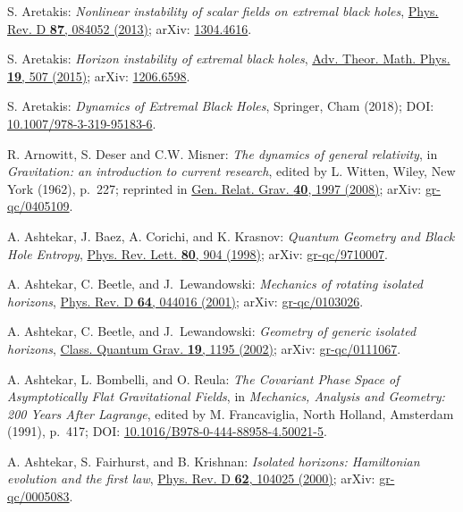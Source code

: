 \begin{thebibliography}{123}
S. Aretakis:
{\em Nonlinear instability of scalar fields on extremal black holes},
\href{https://doi.org/10.1103/PhysRevD.87.084052}{Phys. Rev. D {\bf 87}, 084052 (2013)};
arXiv: \href{https://arxiv.org/abs/1304.4616}{1304.4616}.

S. Aretakis:
{\em Horizon instability of extremal black holes},
\href{https://doi.org/10.4310/ATMP.2015.v19.n3.a1}{Adv. Theor. Math. Phys. {\bf 19}, 507 (2015)};
arXiv: \href{https://arxiv.org/abs/1206.6598}{1206.6598}.

S. Aretakis:
{\em Dynamics of Extremal Black Holes},
Springer, Cham (2018);
DOI: \href{https://doi.org/10.1007/978-3-319-95183-6}{10.1007/978-3-319-95183-6}.

R. Arnowitt, S. Deser and C.W. Misner:
{\em The dynamics of general relativity},
in {\em Gravitation: an introduction to current research},
edited by L. Witten,
Wiley, New York (1962), p.~227; reprinted in
\href{https://doi.org/10.1007/s10714-008-0661-1}{Gen. Relat. Grav. {\bf 40}, 1997 (2008)};
arXiv: \href{https://arxiv.org/abs/gr-qc/0405109}{gr-qc/0405109}.

A. Ashtekar, J. Baez, A. Corichi, and K. Krasnov:
{\em Quantum Geometry and Black Hole Entropy},
\href{https://doi.org/10.1103/PhysRevLett.80.904}{Phys. Rev. Lett. {\bf 80}, 904 (1998)};
arXiv: \href{https://arxiv.org/abs/gr-qc/9710007}{gr-qc/9710007}.

A. Ashtekar, C. Beetle, and J.~Lewandowski:
{\em Mechanics of rotating isolated horizons},
\href{https://doi.org/10.1103/PhysRevD.64.044016}{Phys. Rev. D {\bf 64}, 044016 (2001)};
arXiv: \href{https://arxiv.org/abs/gr-qc/0103026}{gr-qc/0103026}.

A. Ashtekar, C. Beetle, and J.~Lewandowski:
{\em Geometry of generic isolated horizons},
\href{https://doi.org/10.1088/0264-9381/19/6/311}{Class. Quantum Grav. {\bf 19}, 1195 (2002)};
arXiv: \href{https://arxiv.org/abs/gr-qc/0111067}{gr-qc/0111067}.

A. Ashtekar, L. Bombelli, and O. Reula:
{\em The Covariant Phase Space of Asymptotically Flat Gravitational Fields},
in {\em Mechanics, Analysis and Geometry: 200 Years After Lagrange},
edited by M. Francaviglia,
North Holland, Amsterdam (1991), p.~417;
DOI: \href{https://doi.org/10.1016/B978-0-444-88958-4.50021-5}{10.1016/B978-0-444-88958-4.50021-5}.

A. Ashtekar, S. Fairhurst, and B. Krishnan:
{\em Isolated horizons: Hamiltonian evolution and the first law},
\href{https://doi.org/10.1103/PhysRevD.62.104025}{Phys. Rev. D {\bf 62}, 104025 (2000)};
arXiv: \href{https://arxiv.org/abs/gr-qc/0005083}{gr-qc/0005083}.


\end{thebibliography}

